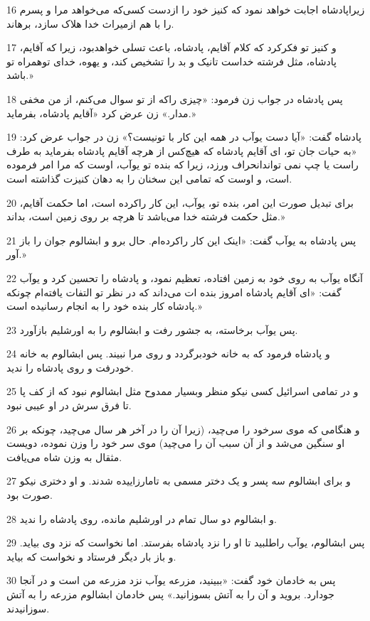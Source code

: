 \par 16 زیراپادشاه اجابت خواهد نمود که کنیز خود را ازدست کسی‌که می‌خواهد مرا و پسرم را با هم ازمیراث خدا هلاک سازد، برهاند.
\par 17 و کنیز تو فکرکرد که کلام آقایم، پادشاه، باعث تسلی خواهدبود، زیرا که آقایم، پادشاه، مثل فرشته خداست تانیک و بد را تشخیص کند، و یهوه، خدای توهمراه تو باشد.»
\par 18 پس پادشاه در جواب زن فرمود: «چیزی راکه از تو سوال می‌کنم، از من مخفی مدار.» زن عرض کرد «آقایم پادشاه، بفرماید.»
\par 19 پادشاه گفت: «آیا دست یوآب در همه این کار با تونیست؟» زن در جواب عرض کرد: «به حیات جان تو، ای آقایم پادشاه که هیچ‌کس از هرچه آقایم پادشاه بفرماید به طرف راست یا چپ نمی تواندانحراف ورزد، زیرا که بنده تو یوآب، اوست که مرا امر فرموده است، و اوست که تمامی این سخنان را به دهان کنیزت گذاشته است.
\par 20 برای تبدیل صورت این امر، بنده تو، یوآب، این کار راکرده است، اما حکمت آقایم، مثل حکمت فرشته خدا می‌باشد تا هر‌چه بر روی زمین است، بداند.»
\par 21 پس پادشاه به یوآب گفت: «اینک این کار راکرده‌ام. حال برو و ابشالوم جوان را باز آور.»
\par 22 آنگاه یوآب به روی خود به زمین افتاده، تعظیم نمود، و پادشاه را تحسین کرد و یوآب گفت: «ای آقایم پادشاه امروز بنده ات می‌داند که در نظر تو التفات یافته‌ام چونکه پادشاه کار بنده خود را به انجام رسانیده است.»
\par 23 پس یوآب برخاسته، به جشور رفت و ابشالوم را به اورشلیم بازآورد.
\par 24 و پادشاه فرمود که به خانه خودبرگردد و روی مرا نبیند. پس ابشالوم به خانه خودرفت و روی پادشاه را ندید.
\par 25 و در تمامی اسرائیل کسی نیکو منظر وبسیار ممدوح مثل ابشالوم نبود که از کف پا تا فرق سرش در او عیبی نبود.
\par 26 و هنگامی که موی سرخود را می‌چید، (زیرا آن را در آخر هر سال می‌چید، چونکه بر او سنگین می‌شد و از آن سبب آن را می‌چید) موی سر خود را وزن نموده، دویست مثقال به وزن شاه می‌یافت.
\par 27 و برای ابشالوم سه پسر و یک دختر مسمی به تامارزاییده شدند. و او دختری نیکو صورت بود.
\par 28 و ابشالوم دو سال تمام در اورشلیم مانده، روی پادشاه را ندید.
\par 29 پس ابشالوم، یوآب راطلبید تا او را نزد پادشاه بفرستد. اما نخواست که نزد وی بیاید. و باز بار دیگر فرستاد و نخواست که بیاید.
\par 30 پس به خادمان خود گفت: «ببینید، مزرعه یوآب نزد مزرعه من است و در آنجا جودارد. بروید و آن را به آتش بسوزانید.» پس خادمان ابشالوم مزرعه را به آتش سوزانیدند.
